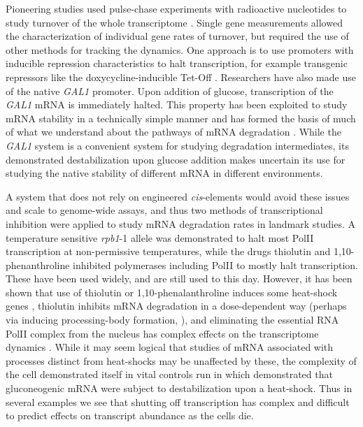 Pioneering studies used pulse-chase experiments with radioactive
nucleotides to study turnover of the whole transcriptome 
\parencite{petersen1976half}.
Single gene measurements allowed the characterization of individual
gene rates of turnover, but required the use of other methods for
tracking the dynamics.
One approach is to use promoters with inducible repression
characteristics to halt transcription, for example transgenic
repressors like the doxycycline-inducible Tet-Off 
\parencite{gari1997set}.
Researchers have also made use of the native \textit{GAL1} promoter. 
Upon addition of glucose, transcription of the \textit{GAL1} mRNA is 
immediately halted. This property has been exploited to study mRNA 
stability in a technically simple manner and has formed the basis of 
much of what we understand about the pathways of mRNA degradation
\parencite{parker2012rna,coller2004eukaryotic}.
While the \textit{GAL1} system is a convenient system for studying 
degradation intermediates, its demonstrated destabilization upon
glucose addition makes uncertain its use for studying the native stability 
of different mRNA in different environments.  

A system
that does not rely on engineered \textit{cis}-elements would avoid 
these issues and scale to genome-wide assays, and thus two methods of
transcriptional inhibition were applied to study mRNA degradation
rates in landmark studies. A temperature sensitive \textit{rpb1}-1 
allele was demonstrated to halt most PolII transcription at 
non-permissive temperatures, while the drugs thiolutin and 
1,10-phenanthroline
inhibited polymerases including PolII to mostly halt transcription.
These have been used widely, and are still used to this day. However,
it has been shown that use of thiolutin or 1,10-phenalanthroline
induces some heat-shock genes \parencite{adams1991yeast}, thiolutin
inhibits mRNA degradation in a dose-dependent way 
\parencite{pelechano2008transcriptional}
(perhaps via inducing processing-body formation,
\cite{huch2016decapping}), 
and eliminating the essential RNA PolII complex
from the nucleus has complex effects on the transcriptome dynamics 
\parencite{yu2016rna}. While it may seem logical that studies of mRNA
associated with processes distinct from heat-shocks may be unaffected
by these, the complexity of the cell demonstrated itself in vital
controls run in \cite{mercado1994levels} which demonstrated that
gluconeogenic mRNA were subject to destabilization upon a
heat-shock. Thus in several examples we see that shutting off 
transcription has complex and difficult to
predict effects on transcript abundance as the cells die.

